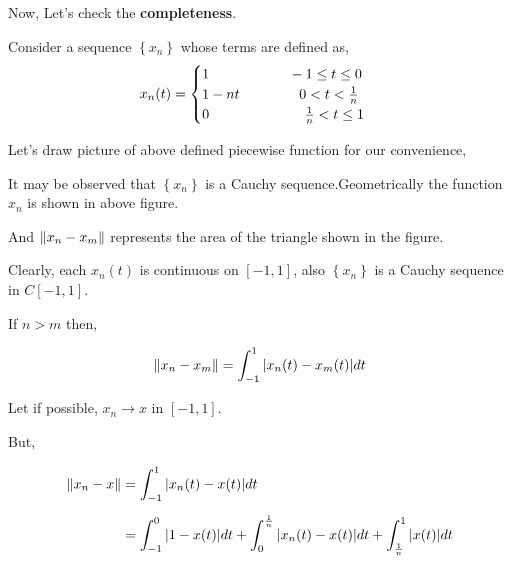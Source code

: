 \documentclass[a4paper,12pt]{article}
\begin{document}
    Now, Let's check the {\bf completeness}.

    Consider a sequence $\left\{x_n\right\}$ whose terms are defined as,
    \begin{equation*}
        x_n(t) = \begin{cases}
            1 \hspace*{2cm} -1\leq t \leq 0\\
            1-nt \hspace*{1.5cm} 0 < t < \frac{1}{n}\\
            0 \hspace*{2.4cm} \frac{1}{n} < t \leq 1
        \end{cases}
    \end{equation*}

    Let's draw picture of above defined piecewise function for our convenience,

    \vspace*{0.3cm}

    \begin{center}
        \def\svgwidth{12cm}
        
    \end{center}

    \pagebreak

    \vspace*{0.3cm}

    It may be observed that $\left\{x_n\right\}$ is a Cauchy sequence.Geometrically the function $x_n$ is shown in above figure.

    And $\norm{x_n - x_m}$ represents the area of the triangle shown in the figure.

    Clearly, each $x_n(t)$ is continuous on $[-1,1]$, also  $\left\{x_n\right\}$ is a Cauchy sequence in $C[-1,1]$.

    \vspace*{0.4cm}

    If $n > m$ then,

    
    \[\norm{x_n - x_m}  = \int_{-1}^{1}|x_n(t) - x_m(t)|dt\]

    Let if possible, $x_n\to x$ in $[-1,1]$.

    But, 
    
    \begin{equation*}
        \begin{split}
            \norm{x_n - x}  & = \int_{-1}^{1}|x_n(t) - x(t)|dt\\[2mm]
            & = \int_{-1}^{0}|1-x(t)|dt + \int_{0}^{\frac{1}{n}}|x_n(t)-x(t)|dt + \int_{\frac{1}{n}}^{1}|x(t)|dt
        \end{split}
    \end{equation*}
\end{document}
